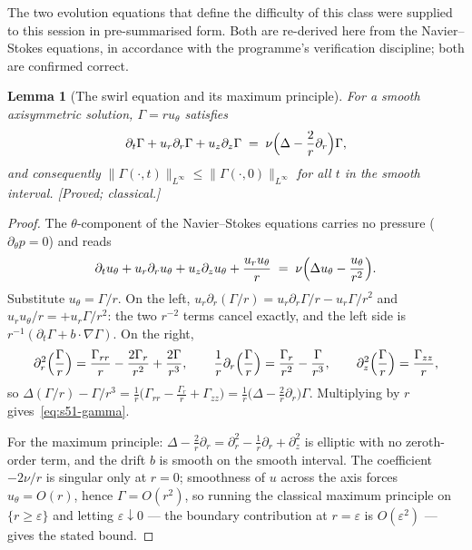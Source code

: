 \documentclass[11pt]{article}
\newtheorem{lemma}[theorem]{Lemma}
\theoremstyle{definition}
\theoremstyle{remark}
\newcommand{\eps}{\varepsilon}
\begin{document}
The two evolution equations that define the difficulty of this class were
supplied to this session in pre-summarised form. Both are re-derived here
from the Navier--Stokes equations, in accordance with the programme's
verification discipline; both are confirmed correct.

\begin{lemma}[The swirl equation and its maximum principle]\label{lem:s51-gamma}
  For a smooth axisymmetric solution, $\Gamma=ru_\theta$ satisfies
  \begin{equation}\label{eq:s51-gamma}
    \partial_t\Gamma + u_r\partial_r\Gamma + u_z\partial_z\Gamma
    \;=\; \nu\Bigl(\Delta - \frac{2}{r}\partial_r\Bigr)\Gamma ,
  \end{equation}
  and consequently
  $\|\Gamma(\cdot,t)\|_{L^\infty}\leq\|\Gamma(\cdot,0)\|_{L^\infty}$ for all
  $t$ in the smooth interval. \emph{[Proved; classical.]}
\end{lemma}
\begin{proof}
  The $\theta$-component of the Navier--Stokes equations carries no pressure
  ($\partial_\theta p=0$) and reads
  \[
    \partial_tu_\theta + u_r\partial_ru_\theta + u_z\partial_zu_\theta
      + \frac{u_ru_\theta}{r}
    \;=\; \nu\Bigl(\Delta u_\theta - \frac{u_\theta}{r^2}\Bigr).
  \]
  Substitute $u_\theta=\Gamma/r$. On the left,
  $u_r\partial_r(\Gamma/r)=u_r\partial_r\Gamma/r-u_r\Gamma/r^2$ and
  $u_ru_\theta/r=+u_r\Gamma/r^2$: the two $r^{-2}$ terms cancel exactly, and
  the left side is $r^{-1}(\partial_t\Gamma+b\cdot\nabla\Gamma)$. On the right,
  \[
    \partial_r^2\Bigl(\frac{\Gamma}{r}\Bigr)
      =\frac{\Gamma_{rr}}{r}-\frac{2\Gamma_r}{r^2}+\frac{2\Gamma}{r^3},
    \qquad
    \frac1r\partial_r\Bigl(\frac{\Gamma}{r}\Bigr)
      =\frac{\Gamma_r}{r^2}-\frac{\Gamma}{r^3},
    \qquad
    \partial_z^2\Bigl(\frac{\Gamma}{r}\Bigr)=\frac{\Gamma_{zz}}{r},
  \]
  so $\Delta(\Gamma/r)-\Gamma/r^3
   =\frac1r\bigl(\Gamma_{rr}-\tfrac{\Gamma_r}{r}+\Gamma_{zz}\bigr)
   =\frac1r\bigl(\Delta-\tfrac2r\partial_r\bigr)\Gamma$.
  Multiplying by $r$ gives~\eqref{eq:s51-gamma}.

  For the maximum principle: $\Delta-\tfrac2r\partial_r
  =\partial_r^2-\tfrac1r\partial_r+\partial_z^2$ is elliptic with no
  zeroth-order term, and the drift $b$ is smooth on the smooth interval. The
  coefficient $-2\nu/r$ is singular only at $r=0$; smoothness of $u$ across
  the axis forces $u_\theta=O(r)$, hence $\Gamma=O(r^2)$, so running the
  classical maximum principle on $\{r\geq\eps\}$ and letting $\eps\downarrow0$
  --- the boundary contribution at $r=\eps$ is $O(\eps^2)$ --- gives the
  stated bound.
\end{proof}
\end{document}
